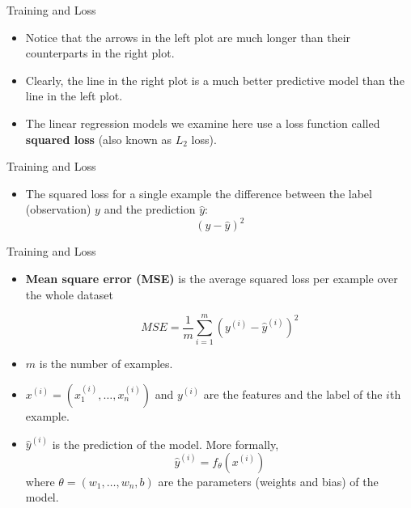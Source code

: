 \documentclass{beamer}
\begin{document}

\begin{frame}{Training and Loss}
\begin{itemize}
\item Notice that the arrows in the left plot are much longer than their counterparts in the right plot. 

\medskip    
\item Clearly, the line in the right plot is a much better predictive model than the line in the left plot.

\medskip
\item The linear regression models we examine here use a loss function called {\bf squared loss} (also known as $L_2$ loss). 
\end{itemize}
\end{frame}


\begin{frame}{Training and Loss}
\begin{itemize}
\item The squared loss for a single example the difference between the label (observation) $y$ and the prediction $\hat{y}$:
$$ (y - \hat{y})^2 $$    
\end{itemize}
\end{frame}


\begin{frame}{Training and Loss}
\begin{itemize}
\item {\bf Mean square error (MSE)} is the average squared loss per example over the whole dataset
    
$$ MSE = \frac{1}{m} \sum_{i=1}^m (y^{(i)} - \hat{y}^{(i)})^2 $$

\medskip
\item $m$ is the number of examples.

\medskip
\item $x^{(i)}=(x^{(i)}_1,\ldots,x^{(i)}_n)$ and $y^{(i)}$ are the features and the label of the $i$th example.

\medskip
\item $\hat{y}^{(i)}$ is the prediction of the model. More formally, 
$$ \hat{y}^{(i)} = f_\theta(x^{(i)}) $$
where $\theta=(w_1,\ldots,w_n, b)$ are the parameters (weights and bias) of the model.
\end{itemize}
\end{frame}

\end{document}
